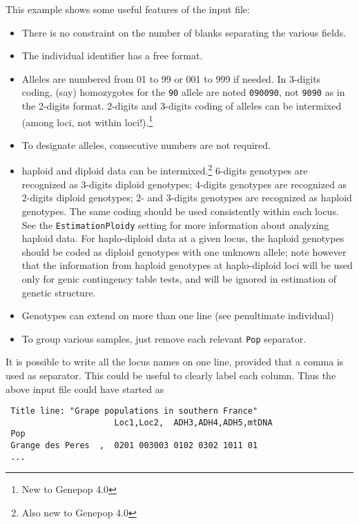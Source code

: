\documentclass[
  12pt,
]{book}
\begin{document}
This example shows some useful features of the input file:

\begin{itemize}
\item
  There is no constraint on the number of blanks separating the various fields.
\item
  The individual identifier has a free format.
\item
  Alleles are numbered from 01 to 99 or 001 to 999 if needed.  In 3-digits coding,  (say) homozygotes for the \texttt{90} allele are noted \texttt{090090}, not \texttt{9090} as in the 2-digits format. 2-digits and 3-digits coding of alleles can be intermixed (among loci, not within loci!).\footnote{New to Genepop 4.0}
\item
  To designate alleles, consecutive numbers are not required.
\item
  haploid and diploid data can be intermixed.\footnote{Also new to Genepop 4.0} 6-digits genotypes are recognized as 3-digits diploid genotypes; 4-digits genotypes are recognized as 2-digits diploid genotypes; 2- and 3-digits genotypes are recognized as haploid genotypes. The same coding should be used consistently within each locus. See the \texttt{EstimationPloidy} setting for more information about analyzing haploid data. For haplo-diploid data at a given locus, the haploid genotypes should be coded as diploid genotypes with one unknown allele; note however that the information from haploid genotypes at haplo-diploid loci will be used only for genic contingency table tests, and will be ignored in estimation of genetic structure.
\item
  Genotypes can extend on more than one line (see penultimate individual)
\item
  To group various samples, just remove each relevant \texttt{Pop} separator.
\end{itemize}

It is possible to write all the locus names on one line, provided that a comma is used as separator. This could be useful to clearly label each column. Thus the above input file could have started as

\begin{verbatim}
 Title line: "Grape populations in southern France"
                      Loc1,Loc2,  ADH3,ADH4,ADH5,mtDNA
 Pop
 Grange des Peres  ,  0201 003003 0102 0302 1011 01
 ...
\end{verbatim}
\end{document}

